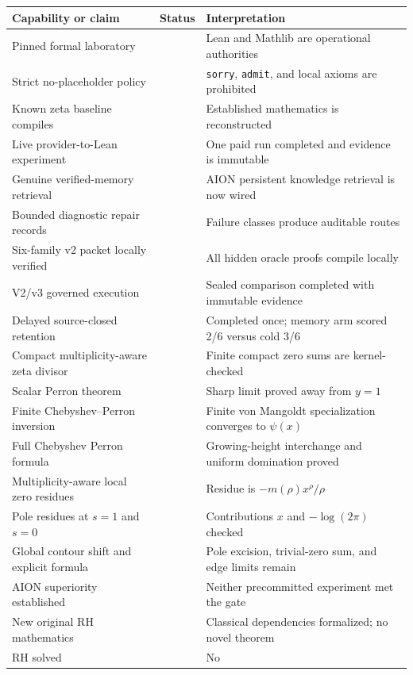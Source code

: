 \documentclass[11pt,a4paper]{article}
\newcommand{\pass}{\textcolor{AionGreen}{\ding{51}}}
\newcommand{\fail}{\textcolor{AionRed}{\ding{55}}}
\newcommand{\pending}{\textcolor{AionAmber}{\raisebox{0.15ex}{\rule{0.8ex}{0.8ex}}}}
\newcommand{\code}[1]{\texttt{#1}}
\begin{document}
\begin{tabularx}{\textwidth}{X c p{55mm}}
\toprule
Capability or claim & Status & Interpretation \\
\midrule
Pinned formal laboratory & \pass & Lean and Mathlib are operational authorities \\
Strict no-placeholder policy & \pass & \code{sorry}, \code{admit}, and local axioms are prohibited \\
Known zeta baseline compiles & \pass & Established mathematics is reconstructed \\
Live provider-to-Lean experiment & \pass & One paid run completed and evidence is immutable \\
Genuine verified-memory retrieval & \pass & AION persistent knowledge retrieval is now wired \\
Bounded diagnostic repair records & \pass & Failure classes produce auditable routes \\
Six-family v2 packet locally verified & \pass & All hidden oracle proofs compile locally \\
V2/v3 governed execution & \pass & Sealed comparison completed with immutable evidence \\
Delayed source-closed retention & \pass & Completed once; memory arm scored 2/6 versus cold 3/6 \\
Compact multiplicity-aware zeta divisor & \pass & Finite compact zero sums are kernel-checked \\
Scalar Perron theorem & \pass & Sharp limit proved away from $y=1$ \\
Finite Chebyshev--Perron inversion & \pass & Finite von Mangoldt specialization converges to $\psi(x)$ \\
Full Chebyshev Perron formula & \pass & Growing-height interchange and uniform domination proved \\
Multiplicity-aware local zero residues & \pass & Residue is $-m(\rho)x^\rho/\rho$ \\
Pole residues at $s=1$ and $s=0$ & \pass & Contributions $x$ and $-\log(2\pi)$ checked \\
Global contour shift and explicit formula & \pending & Pole excision, trivial-zero sum, and edge limits remain \\
AION superiority established & \fail & Neither precommitted experiment met the gate \\
New original RH mathematics & \fail & Classical dependencies formalized; no novel theorem \\
RH solved & \fail & No \\
\bottomrule
\end{tabularx}
\end{document}
